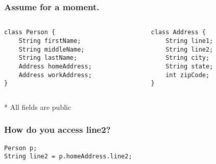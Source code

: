 \documentclass{beamer}
\begin{document}
    \lstset{language=Java}
    \begin{frame}[fragile=singleslide]
        \frametitle{Assume for a moment.}

        \begin{columns}[c]
            \begin{column}[T]{5cm}
                \begin{lstlisting}
class Person {
    String firstName;
    String middleName;
    String lastName;
    Address homeAddress;
    Address workAddress;
}
                \end{lstlisting}
            \end{column}
            \begin{column}[T]{5cm}
                \begin{lstlisting}
class Address {
    String line1;
    String line2;
    String city;
    String state;
    int zipCode;
}
                \end{lstlisting}
            \end{column}
        \end{columns}
        * All fields are public    
    \end{frame}

    \begin{frame}[fragile=singleslide]
        \frametitle{How do you access line2?}

        \begin{lstlisting}
Person p;
String line2 = p.homeAddress.line2;
        \end{lstlisting}
    \end{frame}
\end{document}
